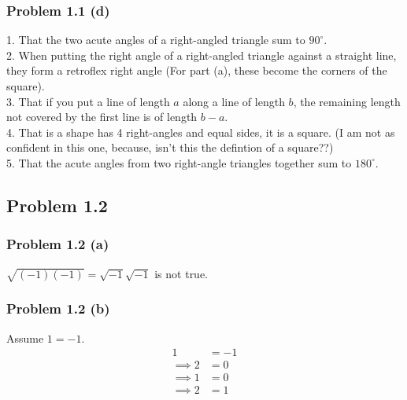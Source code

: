\documentclass{article}
\begin{document}
\subsubsection{Problem 1.1 (d)}
1. That the two acute angles of a right-angled triangle sum to $90^{\circ}$.\\
2. When putting the right angle of a right-angled triangle against a straight line, they form a retroflex right angle (For part (a), these become the corners of the square).\\
3. That if you put a line of length $a$ along a line of length $b$, the remaining length not covered by the first line is of length $b-a$.\\
4. That is a shape has 4 right-angles and equal sides, it is a square. (I am not as confident in this one, because, isn't this the defintion of a square??)\\
5. That the acute angles from two right-angle triangles together sum to $180^{\circ}$.
\subsection{Problem 1.2}
\subsubsection{Problem 1.2 (a)}
$\sqrt{(-1)(-1)}=\sqrt{-1}\sqrt{-1}$ is not true.
\subsubsection{Problem 1.2 (b)}
Assume $1=-1$.
\begin{align}
  1 &= -1 \\
  \implies 2 &= 0 \\
  \implies 1 &= 0 \\
  \implies 2 &= 1
\end{align}
\end{document}
